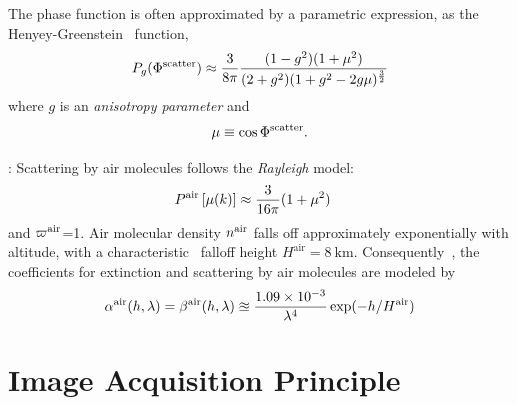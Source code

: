 \documentclass[10pt,letterpaper]{article}
\begin{document}
The phase function is often approximated by a parametric expression,
as the Henyey-Greenstein~\cite{Cornette1995} function,
\begin{align}
  P_g(\Phi^{\rm scatter})\approx \frac{3} {8\pi} \frac{(1 -
    g^2)(1+\mu^2)} {(2+g^2)(1 + g^2 - 2g\mu)^\frac{3}{2}}
  \label{eq:aerosol_scatter}
\end{align}
where $g$ is an {\em anisotropy parameter} and
\begin{align}
  \mu\equiv \cos \Phi^{\rm scatter}.
  \label{eq:mu}
\end{align}

: Scattering by air molecules follows the
{\em Rayleigh} model:
\begin{align}
  P^{\rm air}\left[\mu(k)\right] &\approx \frac{3}{16\pi}(1+\mu^2)
  \label{eq:rayleighP}
\end{align}
and $\varpi^{\rm air}$=1. Air molecular density $n^{\rm air}$ falls
off approximately exponentially with altitude, with a
characteristic~\cite{Levi1980} falloff height $H^\mathrm{air}=8\
\si{\km}$. Consequently~\cite{Levi1980}, the coefficients for
extinction and scattering by air molecules are modeled by
\begin{align}
  \alpha^{\rm air}(h, \lambda)=\beta^{\rm air}(h, \lambda) \approxeq
  \frac{1.09 \times 10^{-3}}{\lambda^4}
  \exp(-h/H^\mathrm{air}) %
  \label{eq:rayleighbeta}
\end{align}


\section{Image Acquisition Principle}
\label{sec:setup}
\end{document}
